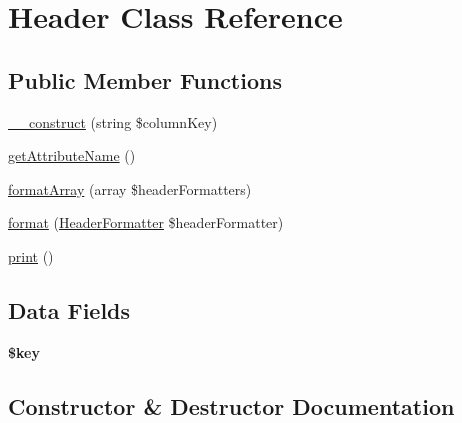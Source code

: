 \hypertarget{classhamburgscleanest_1_1_data_tables_1_1_models_1_1_header}{}\section{Header Class Reference}
\label{classhamburgscleanest_1_1_data_tables_1_1_models_1_1_header}
\subsection*{Public Member Functions}
\begin{DoxyCompactItemize}
\item 
\hyperlink{classhamburgscleanest_1_1_data_tables_1_1_models_1_1_header_ab9936a9a68205e1e45d06b26f1563221}{\+\_\+\+\_\+construct} (string \$column\+Key)
\item 
\hyperlink{classhamburgscleanest_1_1_data_tables_1_1_models_1_1_header_aef428fd06c26df985591f168f4387ddf}{get\+Attribute\+Name} ()
\item 
\hyperlink{classhamburgscleanest_1_1_data_tables_1_1_models_1_1_header_adbfe1566856df6d9c2570c9941a39db6}{format\+Array} (array \$header\+Formatters)
\item 
\hyperlink{classhamburgscleanest_1_1_data_tables_1_1_models_1_1_header_a3d535bcef2cd83c8f69efd922b8ac939}{format} (\hyperlink{interfacehamburgscleanest_1_1_data_tables_1_1_interfaces_1_1_header_formatter}{Header\+Formatter} \$header\+Formatter)
\item 
\hyperlink{classhamburgscleanest_1_1_data_tables_1_1_models_1_1_header_a43374e600f552e0a9308ab96b1964aba}{print} ()
\end{DoxyCompactItemize}
\subsection*{Data Fields}
\begin{DoxyCompactItemize}
\item 
\mbox{\label{classhamburgscleanest_1_1_data_tables_1_1_models_1_1_header_aa60b0284e0dfa2463495481cf11e3cf4}} 
{\bfseries \$key}
\end{DoxyCompactItemize}


\subsection{Constructor \& Destructor Documentation}
\mbox{\label{classhamburgscleanest_1_1_data_tables_1_1_models_1_1_header_ab9936a9a68205e1e45d06b26f1563221}} 
